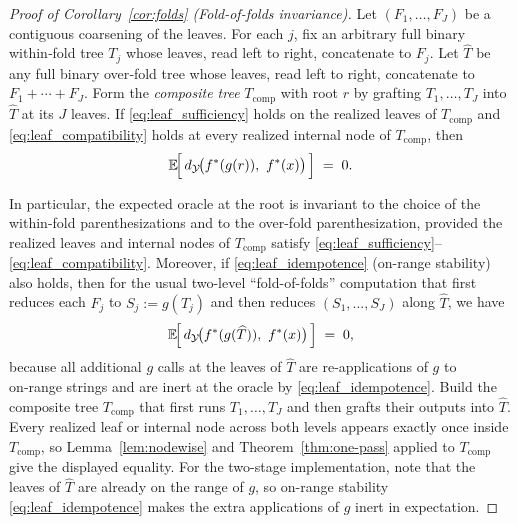 \begin{proof}[Proof of Corollary~\ref{cor:folds} (Fold-of-folds invariance)]
\label{proof:cor-folds}
Let $(F_1,\ldots,F_J)$ be a contiguous coarsening of the leaves. For each $j$, fix an arbitrary full
binary within‑fold tree $T_j$ whose leaves, read left to right, concatenate to $F_j$. Let $\widehat T$ be any full
binary over‑fold tree whose leaves, read left to right, concatenate to $F_1+\cdots+F_J$. Form the
\emph{composite tree} $T_{\mathrm{comp}}$ with root $r$ by grafting $T_1,\ldots,T_J$ into $\widehat T$ at its $J$ leaves.
If \eqref{eq:leaf_sufficiency} holds on the realized leaves of $T_{\mathrm{comp}}$ and \eqref{eq:leaf_compatibility} holds at every realized internal node of $T_{\mathrm{comp}}$, then
\[
\E\!\Big[\,\metric\!\big(\fstar(g(r)),\ \fstar(x)\big)\,\Big]\;=\;0.
\]

In particular, the expected oracle at the root is invariant to the choice of the within-fold parenthesizations and to the over-fold parenthesization, provided the realized leaves and internal nodes of $T_{\mathrm{comp}}$ satisfy \eqref{eq:leaf_sufficiency}–\eqref{eq:leaf_compatibility}. Moreover, if \eqref{eq:leaf_idempotence} (on-range stability) also holds, then for the usual two-level “fold-of-folds” computation that first reduces each $F_j$ to $S_j:=g(T_j)$ and then reduces $(S_1,\ldots,S_J)$ along $\widehat T$, we have
\[
\E\!\Big[\,\metric\!\big(\fstar(g(\widehat T)),\ \fstar(x)\big)\,\Big]\;=\;0,
\]
because all additional $g$ calls at the leaves of $\widehat T$ are re‑applications of $g$ to on‑range strings and are inert at the oracle by \eqref{eq:leaf_idempotence}.
Build the composite tree $T_{\mathrm{comp}}$ that first runs $T_1,\ldots,T_J$ and then grafts their outputs into $\widehat T$. Every realized leaf or internal node across both levels appears exactly once inside $T_{\mathrm{comp}}$, so Lemma~\ref{lem:nodewise} and Theorem~\ref{thm:one-pass} applied to $T_{\mathrm{comp}}$ give the displayed equality. For the two-stage implementation, note that the leaves of $\widehat T$ are already on the range of $g$, so on-range stability \eqref{eq:leaf_idempotence} makes the extra applications of $g$ inert in expectation.
\end{proof}



